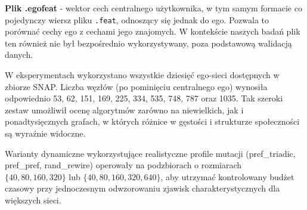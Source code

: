 \textbf{Plik .egofeat} - wektor cech centralnego użytkownika, w tym samym formacie co pojedynczy wiersz pliku \verb|.feat|, odnoszący się jednak do ego. Pozwala to porównać cechy ego z cechami jego znajomych. W kontekście naszych badań plik ten również nie był bezpośrednio wykorzystywany, poza podstawową walidacją danych.

W eksperymentach wykorzystano wszystkie dziesięć ego-sieci dostępnych w zbiorze SNAP. Liczba węzłów (po pominięciu centralnego ego) wynosiła odpowiednio 53, 62, 151, 169, 225, 334, 535, 748, 787 oraz 1035. Tak szeroki zestaw umożliwił ocenę algorytmów zarówno na niewielkich, jak i ponadtysięcznych grafach, w których różnice w gęstości i strukturze społeczności są wyraźnie widoczne.

Warianty dynamiczne wykorzystujące realistyczne profile mutacji (pref\_triadic, pref\_pref, rand\_rewire) operowały na podzbiorach o rozmiarach $\{40,80,160,320\}$ lub $\{40,80,160,320,640\}$, aby utrzymać kontrolowany budżet czasowy przy jednoczesnym odwzorowaniu zjawisk charakterystycznych dla większych sieci.




